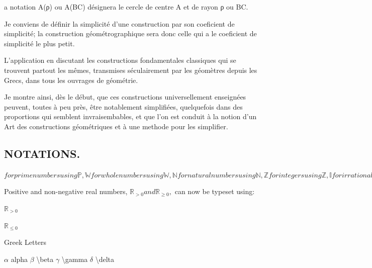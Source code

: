 \documentclass[12pt,a4paper,twocolumn]{book} %
\begin{document}
a notation A(ρ) ou A(BC) désignera le cercle de centre A et de rayon ρ ou BC.


Je conviens de définir la simplicité d'une construction par son coeficient de simplicité; la construction géométrographique sera donc celle qui a le coeficient de simplicité le plus petit.




 L'application en discutant les constructions fondamentales classiques qui se trouvent partout
les mêmes, transmises séculairement par les géomètres depuis
les Grecs, dans tous les ouvrages de géométrie.


Je montre ainsi, dès le début, que ces constructions universellement enseignées peuvent, toutes à peu près, être notablement simplifiées, quelquefois dans des proportions qui semblent invraisembables, et que l'on est conduit à la notion d'un Art des constructions géométriques et à une methode pour les simplifier.

\subsection{NOTATIONS.}
$ for prime numbers using \mathbb{P},
\mathbb{W} for whole numbers using \mathbb{W},
\mathbb{N} for natural numbers using \mathbb{N},
\mathbb{Z} for integers using \mathbb{Z},
\mathbb{I} for irrational numbers using \mathbb{I},
\mathbb{Q} for rational numbers using \mathbb{Q},
\mathbb{R} for real numbers using \mathbb{R} and
\mathbb{C} for complex numbers using \mathbb{C}.$

Positive and non-negative real numbers, $\mathbb{R}_{>0} and \mathbb{R}_{\geq0},$ can now be typeset using:


$\mathbb{R}_{>0}$

$\mathbb{R}_{\leq 0}$

Greek Letters

$\alpha$ 	alpha
$\beta$  \backslash beta 	$\gamma$  \backslash gamma 	$\delta$  \backslash delta
\end{document}
